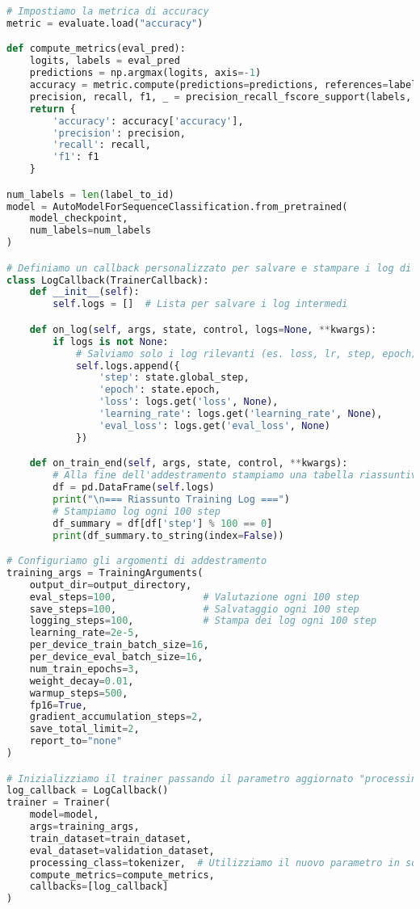 \documentclass[11pt,a4paper]{article}
\begin{document}
\begin{lstlisting}[caption={Codice di Training per il Fine Tuning di BERT}, language=Python]
# Impostiamo la metrica di accuracy
metric = evaluate.load("accuracy")

def compute_metrics(eval_pred):
    logits, labels = eval_pred
    predictions = np.argmax(logits, axis=-1)
    accuracy = metric.compute(predictions=predictions, references=labels)
    precision, recall, f1, _ = precision_recall_fscore_support(labels, predictions, average='weighted')
    return {
        'accuracy': accuracy['accuracy'],
        'precision': precision,
        'recall': recall,
        'f1': f1
    }

num_labels = len(label_to_id)
model = AutoModelForSequenceClassification.from_pretrained(
    model_checkpoint,
    num_labels=num_labels
)

# Definiamo un callback personalizzato per salvare e stampare i log di training
class LogCallback(TrainerCallback):
    def __init__(self):
        self.logs = []  # Lista per salvare i log intermedi

    def on_log(self, args, state, control, logs=None, **kwargs):
        if logs is not None:
            # Salviamo solo i log rilevanti (es. loss, lr, step, epoch)
            self.logs.append({
                'step': state.global_step,
                'epoch': state.epoch,
                'loss': logs.get('loss', None),
                'learning_rate': logs.get('learning_rate', None),
                'eval_loss': logs.get('eval_loss', None)
            })

    def on_train_end(self, args, state, control, **kwargs):
        # Alla fine dell'addestramento stampiamo una tabella riassuntiva
        df = pd.DataFrame(self.logs)
        print("\n=== Riassunto Training Log ===")
        # Stampiamo log ogni 100 step
        df_summary = df[df['step'] % 100 == 0]
        print(df_summary.to_string(index=False))

# Configuriamo gli argomenti di addestramento
training_args = TrainingArguments(
    output_dir=output_directory,
    eval_steps=100,               # Valutazione ogni 100 step
    save_steps=100,               # Salvataggio ogni 100 step
    logging_steps=100,            # Stampa dei log ogni 100 step
    learning_rate=2e-5,
    per_device_train_batch_size=16,
    per_device_eval_batch_size=16,
    num_train_epochs=3,
    weight_decay=0.01,
    warmup_steps=500,
    fp16=True,
    gradient_accumulation_steps=2,
    save_total_limit=2,
    report_to="none"
)

# Inizializziamo il trainer passando il parametro aggiornato "processing_class" invece di "tokenizer"
log_callback = LogCallback()
trainer = Trainer(
    model=model,
    args=training_args,
    train_dataset=train_dataset,
    eval_dataset=validation_dataset,
    processing_class=tokenizer,  # Utilizziamo il nuovo parametro in sostituzione di 'tokenizer'
    compute_metrics=compute_metrics,
    callbacks=[log_callback]
)


\end{lstlisting}
\end{document}
